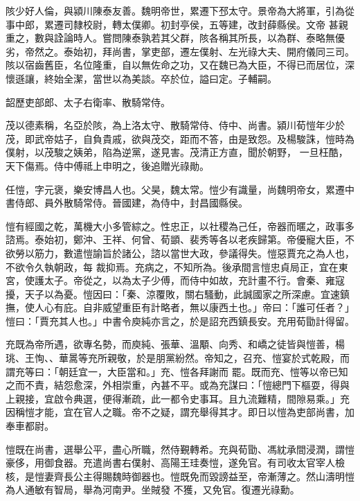 \begin{pinyinscope}
 陔少好人倫，與潁川陳泰友善。魏明帝世，累遷下邳太守。景帝為大將軍，引為從事中郎，累遷司隸校尉，轉太僕卿。初封亭侯，五等建，改封薛縣侯。文帝
 甚親重之，數與詮論時人。嘗問陳泰孰若其父群，陔各稱其所長，以為群、泰略無優劣，帝然之。泰始初，拜尚書，掌吏部，遷左僕射、左光祿大夫、開府儀同三司。陔以宿齒舊臣，名位隆重，自以無佐命之功，又在魏已為大臣，不得已而居位，深懷遜讓，終始全潔，當世以為美談。卒於位，謚曰定。子輔嗣。



 韶歷吏部郎、太子右衛率、散騎常侍。



 茂以德素稱，名亞於陔，為上洛太守、散騎常侍、侍中、尚書。潁川荀愷年少於茂，即武帝姑子，自負貴戚，欲與茂交，距而不答，由是致怨。及楊駿誅，愷時為僕射，以茂駿之姨弟，陷為逆黨，遂見害。茂清正方直，聞於朝野，
 一旦枉酷，天下傷焉。侍中傅祗上申明之，後追贈光祿勛。



 任愷，字元褒，樂安博昌人也。父昊，魏太常。愷少有識量，尚魏明帝女，累遷中書侍郎、員外散騎常侍。晉國建，為侍中，封昌國縣侯。



 愷有經國之乾，萬機大小多管綜之。性忠正，以社稷為己任，帝器而暱之，政事多諮焉。泰始初，鄭沖、王祥、何曾、荀顗、裴秀等各以老疾歸第。帝優寵大臣，不欲勞以筋力，數遣愷諭旨於諸公，諮以當世大政，參議得失。愷惡賈充之為人也，不欲令久執朝政，每
 裁抑焉。充病之，不知所為。後承間言愷忠貞局正，宜在東宮，使護太子。帝從之，以為太子少傅，而侍中如故，充計畫不行。會秦、雍寇擾，天子以為憂。愷因曰：「秦、涼覆敗，關右騷動，此誠國家之所深慮。宜速鎮撫，使人心有庇。自非威望重臣有計略者，無以康西土也。」帝曰：「誰可任者？」愷曰：「賈充其人也。」中書令庾純亦言之，於是詔充西鎮長安。充用荀勖計得留。



 充既為帝所遇，欲專名勢，而庾純、張華、溫顒、向秀、和嶠之徒皆與愷善，楊珧、王恂、、華暠等充所親敬，於是朋黨紛然。帝知之，召充、愷宴於式乾殿，而謂充等曰：「朝廷宜一，大臣當和。」充、愷各拜謝而
 罷。既而充、愷等以帝已知之而不責，結怨愈深，外相崇重，內甚不平。或為充謀曰：「愷總門下樞耍，得與上親接，宜啟令典選，便得漸疏，此一都令史事耳。且九流難精，間隙易乘。」充因稱愷才能，宜在官人之職。帝不之疑，謂充舉得其才。即日以愷為吏部尚書，加奉車都尉。



 愷既在尚書，選舉公平，盡心所職，然侍覲轉希。充與荀勖、馮紞承間浸潤，謂愷豪侈，用御食器。充遣尚書右僕射、高陽王珪奏愷，遂免官。有司收太官宰人檢核，是愷妻齊長公主得賜魏時御器也。愷既免而毀謗益至，帝漸薄之。然山濤明愷為人通敏有智局，舉為河南尹。坐賊發
 不獲，又免官。復遷光祿勳。




\end{pinyinscope}
